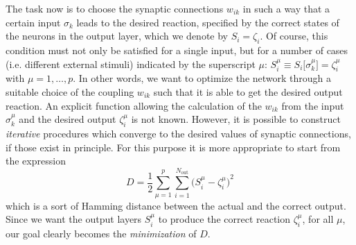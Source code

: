 The task now is to choose the synaptic connections $w_{ik}$ in such a way that a certain input $\sigma_k$ leads to the desired reaction, specified by the correct states of the neurons in the output layer, which we denote by $S_i=\zeta_i$. Of course, this condition must not only be satisfied for a single input, but for a number of cases (i.e. different external stimuli) indicated by the superscript $\mu$: $S_i^\mu\equiv S_i\bigl[\sigma_k^\mu\bigr]=\zeta_i^\mu$ with $\mu=1,\ldots,p$. In other words, we want to optimize the network through a suitable choice of the coupling $w_{ik}$ such that it is able to get the desired output reaction. An explicit function allowing the calculation of the $w_{ik}$ from the input $\sigma_k^\mu$ and the desired output $\zeta_i^\mu$ is not known. However, it is possible to construct \emph{iterative} procedures which converge to the desired values of synaptic connections, if those exist in principle. For this purpose it is more appropriate to start from the expression
\begin{equation}
D=\frac{1}{2}\sum_{\mu=1}^p\sum_{i=1}^{N_{\text{out}}}{\bigl(S_i^\mu-\zeta_i^\mu\bigr)}^2
\end{equation}
which is a sort of Hamming distance between the actual and the correct output. Since we want the output layers $S_i^\mu$ to produce the correct reaction $\zeta_i^\mu$, for all $\mu$, our goal clearly becomes the \emph{minimization} of $D$.

